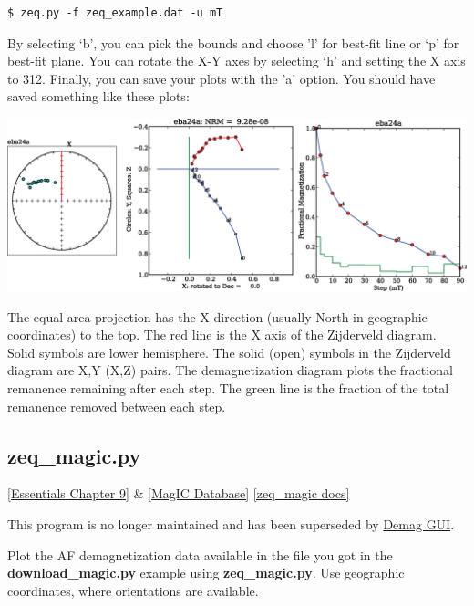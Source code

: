 \documentclass[11pt]{book}
\begin{document}
{\begin{verbatim}
$ zeq.py -f zeq_example.dat -u mT
\end{verbatim}

 By selecting `b', you can pick the bounds and choose 'l' for best-fit line or  `p' for best-fit plane.  You can rotate the X-Y axes  by selecting `h' and setting the X axis to 312.   Finally, you can save your plots with the 'a' option.   You should have saved something like these plots:

{ %
\includegraphics[width=15cm]{EPSfiles/zeq.eps}}

The equal area projection has the X direction (usually North in geographic coordinates)
          to the top.  The red line is the X axis of the Zijderveld diagram.  Solid symbols are lower hemisphere.
          The solid (open) symbols in the Zijderveld diagram are X,Y (X,Z) pairs.  The demagnetization diagram plots the
          fractional remanence remaining after each step. The green line is the fraction of the total remanence removed
          between each step.





\subsection{zeq\_magic.py}
\href{http://earthref.org/MAGIC/books/Tauxe/Essentials/WebBook3ch9.html#ch9}{[Essentials Chapter 9]}  \& \href{#MagICDatabase}{[MagIC Database]}
\href{https://github.com/PmagPy/PmagPy/blob/master/programs/zeq_magic.py}{[zeq\_magic docs]}

This program is no longer maintained and has been superseded by \href{#demag_gui.py}{Demag GUI}.  

Plot the AF demagnetization data available in the file you got in the {\bf download\_magic.py} example using {\bf zeq\_magic.py}.    Use geographic coordinates, where orientations are available.

}
\end{document}
